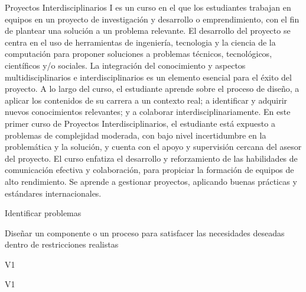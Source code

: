 \begin{syllabus}


\begin{justification}
Proyectos Interdisciplinarios I es un curso en el que los estudiantes trabajan en equipos en un proyecto de investigación y desarrollo o emprendimiento, con el fin de plantear una solución a un problema relevante. El desarrollo del proyecto se centra en el uso de herramientas de ingeniería, tecnologia y la ciencia de la computación para proponer soluciones a problemas técnicos, tecnológicos, científicos y/o sociales. La integración del
conocimiento y aspectos multidisciplinarios e interdisciplinarios es un elemento esencial para el éxito del proyecto. A lo largo del curso, el estudiante aprende sobre el proceso de
diseño, a aplicar los contenidos de su carrera a un contexto real; a identificar y adquirir nuevos conocimientos relevantes; y a colaborar interdisciplinariamente. En este primer curso de Proyectos Interdisciplinarios, el estudiante está expuesto a problemas de complejidad moderada, con bajo nivel incertidumbre en la problemática y la solución, y cuenta con el
apoyo y supervisión cercana del asesor del proyecto. El curso enfatiza el desarrollo y reforzamiento de las habilidades de comunicación efectiva y colaboración, para propiciar la
formación de equipos de alto rendimiento. Se aprende a gestionar proyectos, aplicando buenas prácticas y estándares internacionales.
\end{justification}

\begin{goals}
   \item Identificar problemas
   \item Diseñar un componente o un proceso para satisfacer las necesidades deseadas dentro de restricciones realistas
   
\end{goals}

\begin{outcomes}{V1}
   \item {}
   \item {}
\end{outcomes}

\begin{competences}{V1}
    \item {}
    \item {}
\end{competences}


\end{syllabus}
